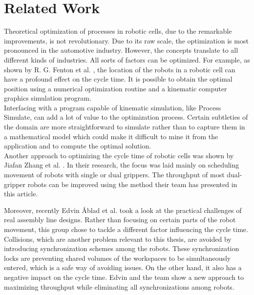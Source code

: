 \section{Related Work}

Theoretical optimization of processes in robotic cells, due to the remarkable improvements, is not revolutionary. Due to its raw scale, the optimization is most pronounced in the automotive industry. However, the concepts translate to all different kinds of industries. All sorts of factors can be optimized. For example, as shown by R. G. Fenton et al. \cite{OptimizationCycleTimeFenton}, the location of the robots in a robotic cell can have a profound effect on the cycle time. It is possible to obtain the optimal position using a numerical optimization routine and a kinematic computer graphics simulation program. \\

Interfacing with a program capable of kinematic simulation, like Process Simulate, can add a lot of value to the optimization process. Certain subtleties of the domain are more straightforward to simulate rather than to capture them in a mathematical model which could make it difficult to mine it from the application and to compute the optimal solution. \\

Another approach to optimizing the cycle time of robotic cells was shown by Jiafan Zhang et al. \cite{OptimizationCycleTimeZhang}. In their research, the focus was laid mainly on scheduling movement of robots with single or dual grippers. The throughput of most dual-gripper robots can be improved using the method their team has presented in this article. 

Moreover, recently Edvin Åblad et al. \cite{CollisionAvoidanceAblad} took a look at the practical challenges of real assembly line designs. 
Rather than focusing on certain parts of the robot movement, this group chose to tackle a different factor influencing the cycle time. Collisions, which are another problem relevant to this thesis, are avoided by introducing synchronization schemes among the robots. 
These synchronization locks are preventing shared volumes of the workspaces to be simultaneously entered, which is a safe way of avoiding issues. On the other hand, it also has a negative impact on the cycle time. Edvin and the team show a new approach to maximizing throughput while eliminating all synchronizations among robots. \\

